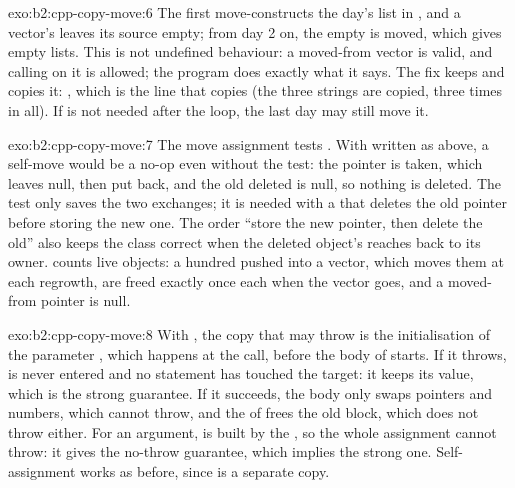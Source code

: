 \begin{solution}{exo:b2:cpp-copy-move:6}
The first  move-constructs the day's list in , and a vector's  leaves its source empty; from day 2 on, the empty  is moved, which gives empty lists. This is
not undefined behaviour: a moved-from vector is valid, and calling  on it is allowed; the program does
exactly what it says. The fix keeps  and copies it: , which is the line that
copies (the three strings are copied, three times in all). If  is not needed after the loop, the last day
may still move it.
\end{solution}

\begin{solution}{exo:b2:cpp-copy-move:7}
The move assignment tests . With  written as above, a self-move would be a no-op even
without the test: the pointer is taken, which leaves  null, then put back, and the old  deleted is
null, so nothing is deleted. The test only saves the two exchanges; it is needed with a  that deletes the old
pointer before storing the new one. The order ``store the new pointer, then delete the old'' also keeps the class correct when the deleted object's
 reaches back to its owner.  counts live objects: a hundred
 pushed into a vector, which moves them at each regrowth, are freed exactly once each when the vector
goes, and a moved-from pointer is null.
\end{solution}

\begin{solution}{exo:b2:cpp-copy-move:8}
With , the copy that may throw is the initialisation of the parameter
, which happens at the call, before the body of  starts. If it throws,  is
never entered and no statement has touched the target: it keeps its value, which is the strong guarantee. If it
succeeds, the body only swaps pointers and numbers, which cannot throw, and the  of  frees the old
block, which does not throw either. For an  argument,  is built by the  , so the whole assignment cannot throw: it gives the no-throw guarantee, which implies the strong one.
Self-assignment works as before, since  is a separate copy.
\end{solution}

